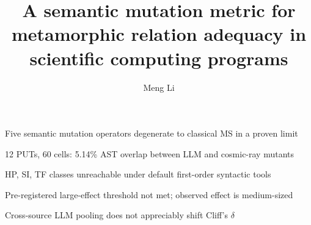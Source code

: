 \documentclass[review,12pt,authoryear]{elsarticle}
\begin{document}
\begin{frontmatter}

\title{A semantic mutation metric for metamorphic relation adequacy in scientific computing programs}

\author[a]{Meng Li}


\begin{highlights}
\item Five semantic mutation operators degenerate to classical MS in a proven limit
\item 12 PUTs, 60 cells: 5.14\% AST overlap between LLM and cosmic-ray mutants
\item HP, SI, TF classes unreachable under default first-order syntactic tools
\item Pre-registered large-effect threshold not met; observed effect is medium-sized
\item Cross-source LLM pooling does not appreciably shift Cliff's $\delta$
\end{highlights}


\end{frontmatter}
\end{document}
